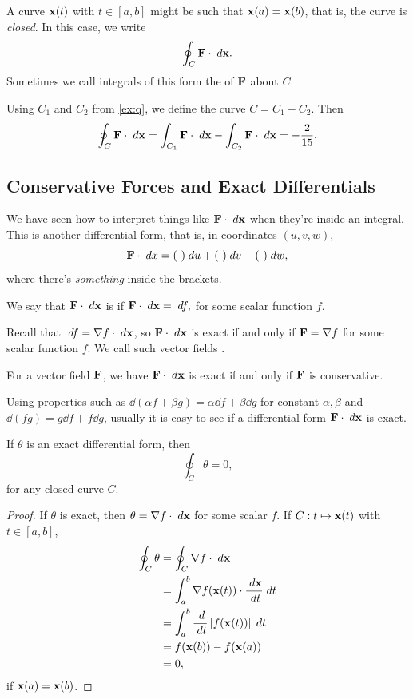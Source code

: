 \documentclass[a4paper]{scrartcl}
\begin{document}
A curve $\mathbf{x}(t)$ with $t \in [a, b]$ might be such that $\mathbf{x}(a) = \mathbf{x}(b)$, that is, the curve is \emph{closed}. In this case, we write
$$
\oint_C \mathbf{F} \cdot \; d \mathbf{x}.
$$
Sometimes we call integrals of this form the  of $\mathbf{F}$ about $C$.

\begin{example}
	Using $C_1$ and $C_2$ from \autoref{ex:q}, we define the curve $C = C_1 - C_2$. Then
	$$
		\oint_C \mathbf{F} \cdot \; d \mathbf{x} = \int_{C_1} \mathbf{F} \cdot \; d \mathbf{x} - \int_{C_2} \mathbf{F} \cdot \; d \mathbf{x} = - \frac{2}{15}.
	$$
\end{example}

\subsection{Conservative Forces and Exact Differentials}

We have seen how to interpret things like $\mathbf{F} \cdot \; d \mathbf{x}$ when they're inside an integral. This is another differential form, that is, in coordinates $(u, v, w)$,
$$
\mathbf{F} \cdot \; d x = (\ )\; d u + (\ ) \; d v + (\ ) \; d w,
$$
where there's \emph{something} inside the brackets.

\begin{definition}[Exactness]
	We say that $\mathbf{F} \cdot\; d \mathbf{x}$ is  if
	$
	\mathbf{F} \cdot \; d \mathbf{x} = \; d f,
	$
	for some scalar function $f$.
\end{definition}

Recall that $\; d f = \nabla f \cdot \; d \mathbf{x}$, so $\mathbf{F} \cdot \; d \mathbf{x}$ is exact if and only if $\mathbf{F} = \nabla f$ for some scalar function $f$. We call such vector fields .


For a vector field $\mathbf{F}$, we have $\mathbf{F} \cdot \; d \mathbf{x}$ is exact if and only if $\mathbf{F}$ is conservative.

Using properties such as $\dd(\alpha f + \beta g) = \alpha \dd f + \beta \dd g$ for constant $\alpha, \beta$ and $\dd(fg) = g \dd f + f \dd g$, usually it is easy to see if a differential form $\mathbf{F} \cdot \; d \mathbf{x}$ is exact.

\begin{proposition}
	If $\theta$ is an exact differential form, then
	$$
	\oint_C \theta = 0,
	$$
	for any closed curve $C$.
\end{proposition}
\begin{proof}
	If $\theta$ is exact, then $\theta = \nabla f \cdot \; d \mathbf{x}$ for some scalar $f$. If $C: t \mapsto \mathbf{x}(t)$ with $t \in [a, b]$,
	\begin{align*}
		\oint_C \theta &= \oint_C \nabla f \cdot \; d \mathbf{x} \\
			&= \int_{a}^b \nabla f(\mathbf{x}(t)) \cdot \frac{\; d \mathbf{x}}{\; d t} \; d t \\
			&= \int_a^b \frac{\; d}{\; d t} \left[f(\mathbf{x}(t))\right] \; d t \\
			&= f(\mathbf{x}(b)) - f(\mathbf{x}(a))\\
			&= 0,
	\end{align*}
	if $\mathbf{x}(a) = \mathbf{x}(b)$.
\end{proof}
\end{document}
